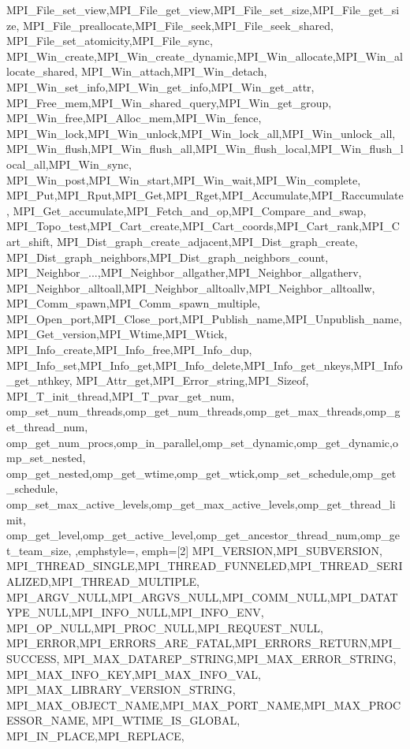 {{    MPI_File_set_view,MPI_File_get_view,MPI_File_set_size,MPI_File_get_size,
    MPI_File_preallocate,MPI_File_seek,MPI_File_seek_shared,
    MPI_File_set_atomicity,MPI_File_sync,
    MPI_Win_create,MPI_Win_create_dynamic,MPI_Win_allocate,MPI_Win_allocate_shared,
    MPI_Win_attach,MPI_Win_detach,
    MPI_Win_set_info,MPI_Win_get_info,MPI_Win_get_attr,
    MPI_Free_mem,MPI_Win_shared_query,MPI_Win_get_group,
    MPI_Win_free,MPI_Alloc_mem,MPI_Win_fence,
    MPI_Win_lock,MPI_Win_unlock,MPI_Win_lock_all,MPI_Win_unlock_all,
    MPI_Win_flush,MPI_Win_flush_all,MPI_Win_flush_local,MPI_Win_flush_local_all,MPI_Win_sync,
    MPI_Win_post,MPI_Win_start,MPI_Win_wait,MPI_Win_complete,
    MPI_Put,MPI_Rput,MPI_Get,MPI_Rget,MPI_Accumulate,MPI_Raccumulate,
    MPI_Get_accumulate,MPI_Fetch_and_op,MPI_Compare_and_swap,
    MPI_Topo_test,MPI_Cart_create,MPI_Cart_coords,MPI_Cart_rank,MPI_Cart_shift,
    MPI_Dist_graph_create_adjacent,MPI_Dist_graph_create,
    MPI_Dist_graph_neighbors,MPI_Dist_graph_neighbors_count,
    MPI_Neighbor_...,MPI_Neighbor_allgather,MPI_Neighbor_allgatherv,
    MPI_Neighbor_alltoall,MPI_Neighbor_alltoallv,MPI_Neighbor_alltoallw,
    MPI_Comm_spawn,MPI_Comm_spawn_multiple,
    MPI_Open_port,MPI_Close_port,MPI_Publish_name,MPI_Unpublish_name,
    MPI_Get_version,MPI_Wtime,MPI_Wtick,
    MPI_Info_create,MPI_Info_free,MPI_Info_dup,
    MPI_Info_set,MPI_Info_get,MPI_Info_delete,MPI_Info_get_nkeys,MPI_Info_get_nthkey,
    MPI_Attr_get,MPI_Error_string,MPI_Sizeof,
    MPI_T_init_thread,MPI_T_pvar_get_num,
    omp_set_num_threads,omp_get_num_threads,omp_get_max_threads,omp_get_thread_num,
    omp_get_num_procs,omp_in_parallel,omp_set_dynamic,omp_get_dynamic,omp_set_nested,
    omp_get_nested,omp_get_wtime,omp_get_wtick,omp_set_schedule,omp_get_schedule,
    omp_set_max_active_levels,omp_get_max_active_levels,omp_get_thread_limit,
    omp_get_level,omp_get_active_level,omp_get_ancestor_thread_num,omp_get_team_size,
  },emphstyle={\color{red!70!black}\bfseries},
  emph={[2] %
    MPI_VERSION,MPI_SUBVERSION,
    MPI_THREAD_SINGLE,MPI_THREAD_FUNNELED,MPI_THREAD_SERIALIZED,MPI_THREAD_MULTIPLE,
    MPI_ARGV_NULL,MPI_ARGVS_NULL,MPI_COMM_NULL,MPI_DATATYPE_NULL,MPI_INFO_NULL,MPI_INFO_ENV,
    MPI_OP_NULL,MPI_PROC_NULL,MPI_REQUEST_NULL,
    MPI_ERROR,MPI_ERRORS_ARE_FATAL,MPI_ERRORS_RETURN,MPI_SUCCESS,
    MPI_MAX_DATAREP_STRING,MPI_MAX_ERROR_STRING,
    MPI_MAX_INFO_KEY,MPI_MAX_INFO_VAL, MPI_MAX_LIBRARY_VERSION_STRING,
    MPI_MAX_OBJECT_NAME,MPI_MAX_PORT_NAME,MPI_MAX_PROCESSOR_NAME,    
    MPI_WTIME_IS_GLOBAL, MPI_IN_PLACE,MPI_REPLACE,
}}
